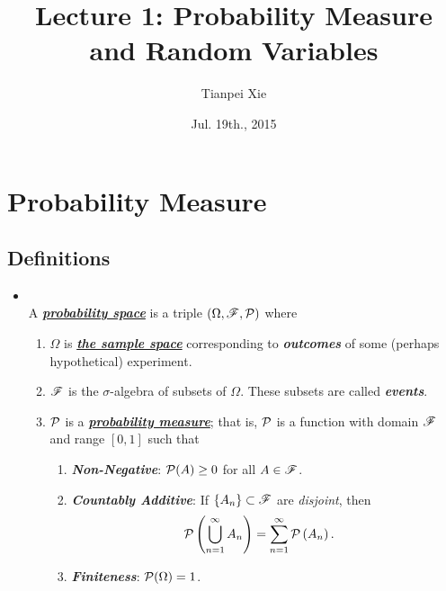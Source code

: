 \documentclass[11pt]{article}
\begin{document}
\title{Lecture 1: Probability Measure and Random Variables}
\author{ Tianpei Xie}
\date{ Jul. 19th., 2015 }
\maketitle
\tableofcontents
\newpage
\section{Probability Measure}
\subsection{Definitions}
\begin{itemize}
\item \begin{definition} \citep{resnick2013probability, billingsley2008probability}\\
A \underline{\emph{\textbf{probability space}}} is a triple $(\Omega, {\mathscr F}, {\mathcal P})$ where
\begin{enumerate}
\item $\Omega$ is \underline{\emph{\textbf{the sample space}}} corresponding to \emph{\textbf{outcomes}} of some (perhaps hypothetical) experiment.
\item ${\mathscr F}$ is the $\sigma$-algebra of subsets of $\Omega$. These subsets are called \emph{\textbf{events}}.
\item ${\mathcal P}$ is a \underline{\emph{\textbf{probability measure}}}; that is, ${\mathcal P}$ is a function with domain ${\mathscr F}$ and range $[0, 1]$ such that
\begin{enumerate}
\item \emph{\textbf{Non-Negative}}: ${\mathcal P}(A)\ge 0$ for all $A\in {\mathscr F}$.
\item \emph{\textbf{Countably Additive}}: If $\left\{A_{n}\right\}\subset {\mathscr F}$ are \emph{disjoint}, then 
\begin{align*}
{\mathcal P}\left(\bigcup_{n=1}^{\infty}A_{n}\right) &= \sum_{n=1}^{\infty}{\mathcal P}\left(A_{n}\right).
\end{align*}
\item \emph{\textbf{Finiteness}}: ${\mathcal P}(\Omega) = 1$.
\end{enumerate}
\end{enumerate}
\end{definition}


\end{itemize}
\end{document}

